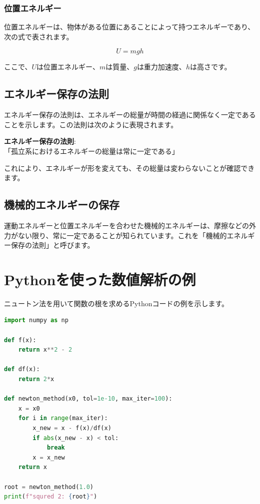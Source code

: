 \documentclass[
  11pt,
  a4paper]{ltjsarticle}
\begin{document}
\subsubsection{位置エネルギー}\label{ux4f4dux7f6eux30a8ux30cdux30ebux30aeux30fc}

位置エネルギーは、物体がある位置にあることによって持つエネルギーであり、次の式で表されます。

\[
U = mgh
\]

ここで、\(U\)は位置エネルギー、\(m\)は質量、\(g\)は重力加速度、\(h\)は高さです。

\subsection{エネルギー保存の法則}\label{ux30a8ux30cdux30ebux30aeux30fcux4fddux5b58ux306eux6cd5ux5247-1}

エネルギー保存の法則は、エネルギーの総量が時間の経過に関係なく一定であることを示します。この法則は次のように表現されます。

\begin{tcolorbox}

\textbf{エネルギー保存の法則}:\\
「孤立系におけるエネルギーの総量は常に一定である」

\end{tcolorbox}

これにより、エネルギーが形を変えても、その総量は変わらないことが確認できます。

\subsection{機械的エネルギーの保存}\label{ux6a5fux68b0ux7684ux30a8ux30cdux30ebux30aeux30fcux306eux4fddux5b58}

運動エネルギーと位置エネルギーを合わせた機械的エネルギーは、摩擦などの外力がない限り、常に一定であることが知られています。これを「機械的エネルギー保存の法則」と呼びます。

\section{Pythonを使った数値解析の例}\label{pythonux3092ux4f7fux3063ux305fux6570ux5024ux89e3ux6790ux306eux4f8b}

ニュートン法を用いて関数の根を求めるPythonコードの例を示します。

\begin{lstlisting}[language=Python]
import numpy as np

def f(x):
    return x**2 - 2

def df(x):
    return 2*x

def newton_method(x0, tol=1e-10, max_iter=100):
    x = x0
    for i in range(max_iter):
        x_new = x - f(x)/df(x)
        if abs(x_new - x) < tol:
            break
        x = x_new
    return x

root = newton_method(1.0)
print(f"squred 2: {root}")
\end{lstlisting}
\end{document}
